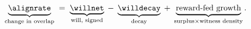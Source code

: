 \[
  \underbrace{\alignrate}_{\text{change in overlap}}
  \;=\; \underbrace{\willnet}_{\text{will, signed}}
  \;-\; \underbrace{\willdecay}_{\text{decay}}
  \;+\; \underbrace{\text{reward-fed growth}}_{\text{surplus}\times\text{witness density}}.
\]
